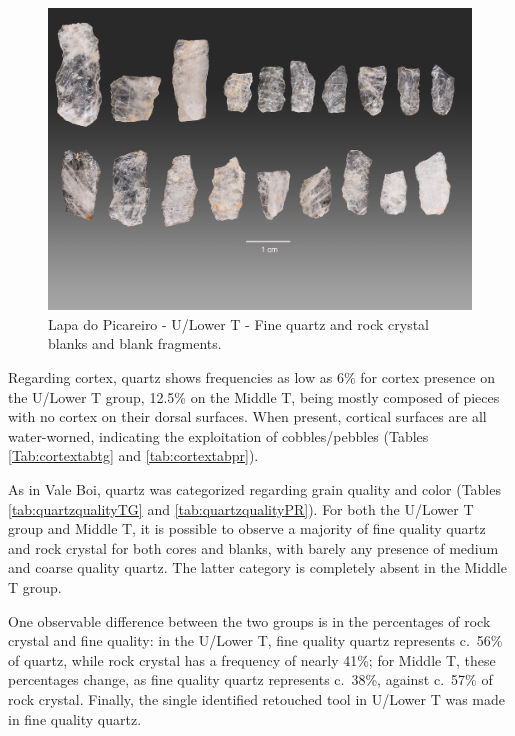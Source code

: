 \documentclass[12pt,twoside]{reedthesis}
\begin{document}
~
\begin{figure}[H]

{\centering \includegraphics[width=0.6\linewidth]{figure/prancha_bladelets} 

}

\caption{Lapa do Picareiro - U/Lower T - Fine quartz and rock crystal blanks and blank fragments.}\label{fig:quartzbladelet}
\end{figure}
Regarding cortex, quartz shows frequencies as low as 6\% for cortex presence on the U/Lower T group, 12.5\% on the Middle T, being mostly composed of pieces with no cortex on their dorsal surfaces. When present, cortical surfaces are all water-worned, indicating the exploitation of cobbles/pebbles (Tables \ref{Tab:cortextabtg} and \ref{tab:cortextabpr}).

As in Vale Boi, quartz was categorized regarding grain quality and color (Tables \ref{tab:quartzqualityTG} and \ref{tab:quartzqualityPR}). For both the U/Lower T group and Middle T, it is possible to observe a majority of fine quality quartz and rock crystal for both cores and blanks, with barely any presence of medium and coarse quality quartz. The latter category is completely absent in the Middle T group.

One observable difference between the two groups is in the percentages of rock crystal and fine quality: in the U/Lower T, fine quality quartz represents c.~56\% of quartz, while rock crystal has a frequency of nearly 41\%; for Middle T, these percentages change, as fine quality quartz represents c.~38\%, against c.~57\% of rock crystal. Finally, the single identified retouched tool in U/Lower T was made in fine quality quartz.
\end{document}
